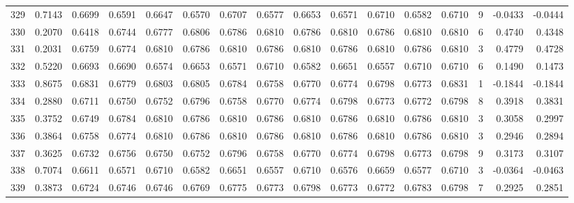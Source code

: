 \begin{tabular}{lrrrrrrrrrrrrrrr}
329 &      0.7143 &  0.6699 &  0.6591 &  0.6647 &  0.6570 &  0.6707 &  0.6577 &  0.6653 &  0.6571 &  0.6710 &   0.6582 &     0.6710 &      9 &                   -0.0433 &                    -0.0444 \\
330 &      0.2070 &  0.6418 &  0.6744 &  0.6777 &  0.6806 &  0.6786 &  0.6810 &  0.6786 &  0.6810 &  0.6786 &   0.6810 &     0.6810 &      6 &                    0.4740 &                     0.4348 \\
331 &      0.2031 &  0.6759 &  0.6774 &  0.6810 &  0.6786 &  0.6810 &  0.6786 &  0.6810 &  0.6786 &  0.6810 &   0.6786 &     0.6810 &      3 &                    0.4779 &                     0.4728 \\
332 &      0.5220 &  0.6693 &  0.6690 &  0.6574 &  0.6653 &  0.6571 &  0.6710 &  0.6582 &  0.6651 &  0.6557 &   0.6710 &     0.6710 &      6 &                    0.1490 &                     0.1473 \\
333 &      0.8675 &  0.6831 &  0.6779 &  0.6803 &  0.6805 &  0.6784 &  0.6758 &  0.6770 &  0.6774 &  0.6798 &   0.6773 &     0.6831 &      1 &                   -0.1844 &                    -0.1844 \\
334 &      0.2880 &  0.6711 &  0.6750 &  0.6752 &  0.6796 &  0.6758 &  0.6770 &  0.6774 &  0.6798 &  0.6773 &   0.6772 &     0.6798 &      8 &                    0.3918 &                     0.3831 \\
335 &      0.3752 &  0.6749 &  0.6784 &  0.6810 &  0.6786 &  0.6810 &  0.6786 &  0.6810 &  0.6786 &  0.6810 &   0.6786 &     0.6810 &      3 &                    0.3058 &                     0.2997 \\
336 &      0.3864 &  0.6758 &  0.6774 &  0.6810 &  0.6786 &  0.6810 &  0.6786 &  0.6810 &  0.6786 &  0.6810 &   0.6786 &     0.6810 &      3 &                    0.2946 &                     0.2894 \\
337 &      0.3625 &  0.6732 &  0.6756 &  0.6750 &  0.6752 &  0.6796 &  0.6758 &  0.6770 &  0.6774 &  0.6798 &   0.6773 &     0.6798 &      9 &                    0.3173 &                     0.3107 \\
338 &      0.7074 &  0.6611 &  0.6571 &  0.6710 &  0.6582 &  0.6651 &  0.6557 &  0.6710 &  0.6576 &  0.6659 &   0.6577 &     0.6710 &      3 &                   -0.0364 &                    -0.0463 \\
339 &      0.3873 &  0.6724 &  0.6746 &  0.6746 &  0.6769 &  0.6775 &  0.6773 &  0.6798 &  0.6773 &  0.6772 &   0.6783 &     0.6798 &      7 &                    0.2925 &                     0.2851 \\

\end{tabular}
